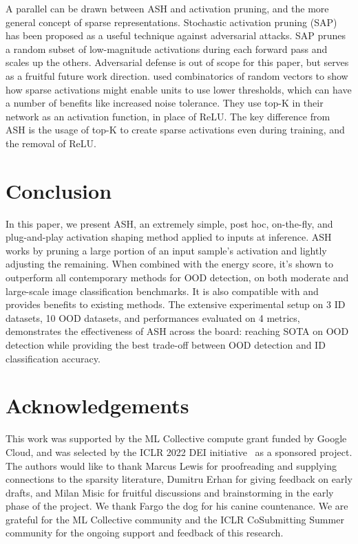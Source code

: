 \documentclass{article}
\begin{document}
A parallel can be drawn between ASH and activation pruning, and the more general concept of sparse representations. Stochastic activation pruning (SAP)~\citep{dhillon2018stochastic} has been proposed as a useful technique against adversarial attacks. SAP prunes a random subset of low-magnitude activations during each forward pass and scales up the others. 
Adversarial defense is out of scope for this paper, but serves as a fruitful future work direction.
\citet{ahmad2019can} used combinatorics of random vectors to show how sparse activations might enable units to use lower thresholds, which can have a number of benefits like increased noise tolerance. They use top-K in their network as an activation function, in place of ReLU. The key difference from ASH is the usage of top-K to create sparse activations even during training, and the removal of ReLU. 













\section{Conclusion}
In this paper, we present ASH, an extremely simple, post hoc, on-the-fly, and plug-and-play activation shaping method applied to inputs at inference. ASH works by pruning a large portion of an input sample’s activation and lightly adjusting the remaining. When combined with the energy score, it's shown to outperform all contemporary methods for OOD detection, on both moderate and large-scale image classification benchmarks. It is also compatible with and provides benefits to existing methods. The extensive experimental setup on 3 ID datasets, 10 OOD datasets, and performances evaluated on 4 metrics, demonstrates the effectiveness of ASH across the board: reaching SOTA on OOD detection while providing the best trade-off between OOD detection and ID classification accuracy. 




\section*{Acknowledgements} 
This work was supported by the ML Collective compute grant funded by Google Cloud, and was selected by the ICLR 2022 DEI initiative~\citep{CSS1, CSS2} as a sponsored project.
The authors would like to thank Marcus Lewis for proofreading and supplying connections to the sparsity literature, Dumitru Erhan for giving feedback on early drafts, and Milan Misic for fruitful discussions and brainstorming in the early phase of the project. We thank Fargo the dog for his canine countenance.
We are grateful for the ML Collective community and the ICLR CoSubmitting Summer community for the ongoing support and feedback of this research.
\end{document}
